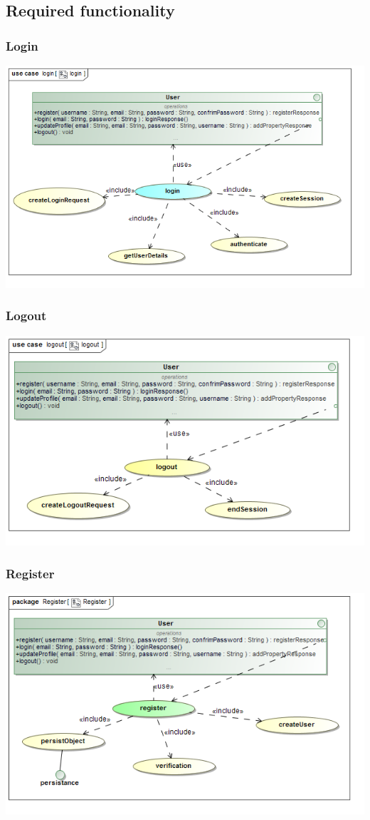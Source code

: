 \documentclass[a4paper,12pt]{article}
\begin{document}
\subsection{Required functionality}
\subsubsection{Login}
\includegraphics[width=1\textwidth]{./Images/newDiagrams/requiredFunctionality/Diana/login.png}
\subsubsection{Logout}
\includegraphics[width=1\textwidth]{./Images/newDiagrams/requiredFunctionality/Diana/logout.png}
\subsubsection{Register}
\includegraphics[width=1\textwidth]{./Images/newDiagrams/requiredFunctionality/Diana/register.png}
\end{document}
